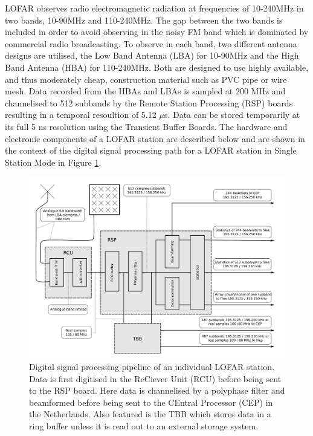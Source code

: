 LOFAR observes radio electromagnetic radiation at frequencies of 10-240MHz in two bands, 10-90MHz and 110-240MHz. The gap between the two bands is included in order to avoid observing in the noisy FM band which is dominated by commercial radio broadcasting. To observe in each band, two different antenna designs are utilised, the Low Band Antenna (LBA) for 10-90MHz and the High Band Antenna (HBA) for 110-240MHz. Both are designed to use highly available, and thus moderately cheap, construction material such as PVC pipe or wire mesh. %
Data recorded from the HBAs and LBAs is sampled at 200 MHz and channelised to 512 subbands by the Remote Station Processing (RSP) boards resulting in a temporal resoultion of 5.12 $\mu$s. Data can be stored temporarily at its full 5 ns resolution using the Transient Buffer Boards.
The hardware and electronic components of a LOFAR station are described below and are shown in the context of the digital signal processing path for a LOFAR station in Single Station Mode in Figure \ref{fig:sig_pipe}.
\begin{figure}
    \centering
    \includegraphics[width=0.75\columnwidth]{Images/Digital_signal_processing.png}
    \caption[Digital signal processing pipeline of an individual LOFAR station.]{Digital signal processing pipeline of an individual LOFAR station. Data is first digitised in the ReCiever Unit (RCU) before being sent to the RSP board. Here data is channelised by a polyphase filter and beamformed before being sent to the CEntral Processor (CEP) in the Netherlands. Also featured is the TBB which stores data in a ring buffer unless it is read out to an external storage system. }
    \label{fig:sig_pipe}
\end{figure}
